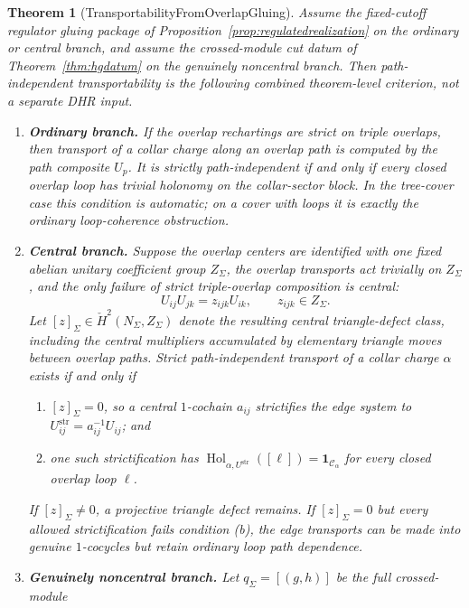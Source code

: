 \documentclass[11pt]{article}
\newtheorem{theorem}{Theorem}[section]
\begin{document}
\begin{theorem}[TransportabilityFromOverlapGluing]\label{thm:transport-from-gluing}
Assume the fixed-cutoff regulator gluing package of Proposition~\ref{prop:regulatedrealization}
on the ordinary or central branch, and assume the crossed-module cut datum of
Theorem~\ref{thm:hgdatum} on the genuinely noncentral branch. Then path-independent
transportability is the following combined theorem-level criterion, not a separate DHR input.
\begin{enumerate}[label=\textup{(\roman*)},leftmargin=2em]
\item \textbf{Ordinary branch.} If the overlap rechartings are strict on triple overlaps, then
transport of a collar charge along an overlap path is computed by the path composite \(U_p\).
It is strictly path-independent if and only if every closed overlap loop has trivial holonomy on
the collar-sector block. In the tree-cover case this condition is automatic; on a cover with
loops it is exactly the ordinary loop-coherence obstruction.
\item \textbf{Central branch.} Suppose the overlap centers are identified with one fixed abelian
unitary coefficient group \(Z_\Sigma\), the overlap transports act trivially on \(Z_\Sigma\), and
the only failure of strict triple-overlap composition is central:
\[
U_{ij}U_{jk}=z_{ijk}U_{ik},\qquad z_{ijk}\in Z_\Sigma.
\]
Let \([z]_\Sigma\in \check H^2(N_\Sigma,Z_\Sigma)\) denote the resulting central triangle-defect class,
including the central multipliers accumulated by elementary triangle moves between overlap
paths. Strict path-independent transport of a collar charge \(\alpha\) exists if and only if
\begin{enumerate}[label=\textup{(\alph*)},leftmargin=2em]
\item \([z]_\Sigma=0\), so a central \(1\)-cochain \(a_{ij}\) strictifies the edge system to
\(U^{\mathrm{str}}_{ij}=a_{ij}^{-1}U_{ij}\); and
\item one such strictification has
\(\operatorname{Hol}_{\alpha,U^{\mathrm{str}}}([\ell])=\mathbf 1_{\mathcal C_\alpha}\) for every closed
overlap loop \(\ell\).
\end{enumerate}
If \([z]_\Sigma\ne0\), a projective triangle defect remains. If \([z]_\Sigma=0\) but every
allowed strictification fails condition \textup{(b)}, the edge transports can be made into genuine
\(1\)-cocycles but retain ordinary loop path dependence.
\item \textbf{Genuinely noncentral branch.} Let \(q_\Sigma=[(g,h)]\) be the full crossed-module

\end{enumerate}
\end{theorem}
\end{document}
